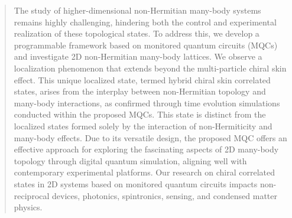 \documentclass[longbibliography, aps, prx, amsmath, amssymb, amsfonts, twocolumn,superscriptaddress, footinbib]{revtex4-1}
\begin{document}
	
	
	
	\begin{abstract}

		The study of higher-dimensional non-Hermitian many-body systems remains highly challenging, hindering both the control and experimental realization of these topological states.
		To address this, we develop a programmable framework based on monitored quantum circuits (MQCs) and investigate 2D non-Hermitian many-body lattices.
		We observe a localization phenomenon that extends beyond the multi-particle chiral skin effect. This unique localized state, termed hybrid chiral skin correlated states, arises from the interplay between non-Hermitian topology and many-body interactions, as confirmed through time evolution simulations conducted within the proposed MQCs. This state is distinct from the localized states formed solely by the interaction of non-Hermiticity and many-body effects. Due to its versatile design, the proposed MQC offers an effective approach for exploring the fascinating aspects of 2D many-body topology through digital quantum simulation, aligning well with contemporary experimental platforms.
		Our research on chiral correlated states in 2D systems based on monitored quantum circuits impacts non-reciprocal devices, photonics, spintronics, sensing, and condensed matter physics. 
	\end{abstract}
	
\end{document}

